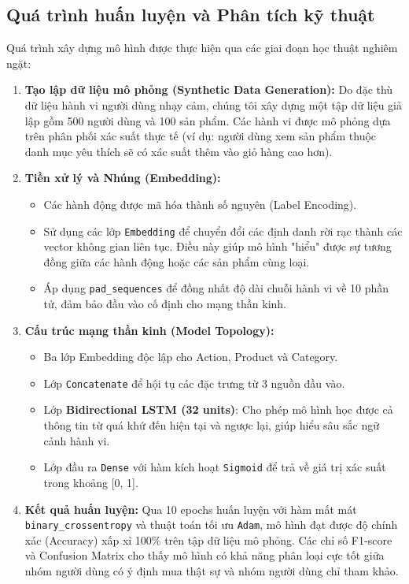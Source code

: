 \documentclass[12pt,a4paper]{report}
\begin{document}
\subsection{Quá trình huấn luyện và Phân tích kỹ thuật}
Quá trình xây dựng mô hình được thực hiện qua các giai đoạn học thuật nghiêm ngặt:
\begin{enumerate}
    \item \textbf{Tạo lập dữ liệu mô phỏng (Synthetic Data Generation):} Do đặc thù dữ liệu hành vi người dùng nhạy cảm, chúng tôi xây dựng một tập dữ liệu giả lập gồm 500 người dùng và 100 sản phẩm. Các hành vi được mô phỏng dựa trên phân phối xác suất thực tế (ví dụ: người dùng xem sản phẩm thuộc danh mục yêu thích sẽ có xác suất thêm vào giỏ hàng cao hơn).
    \item \textbf{Tiền xử lý và Nhúng (Embedding):}
        \begin{itemize}
            \item Các hành động được mã hóa thành số nguyên (Label Encoding).
            \item Sử dụng các lớp \texttt{Embedding} để chuyển đổi các định danh rời rạc thành các vector không gian liên tục. Điều này giúp mô hình "hiểu" được sự tương đồng giữa các hành động hoặc các sản phẩm cùng loại.
            \item Áp dụng \texttt{pad\_sequences} để đồng nhất độ dài chuỗi hành vi về 10 phần tử, đảm bảo đầu vào cố định cho mạng thần kinh.
        \end{itemize}
    \item \textbf{Cấu trúc mạng thần kinh (Model Topology):}
        \begin{itemize}
            \item Ba lớp Embedding độc lập cho Action, Product và Category.
            \item Lớp \texttt{Concatenate} để hội tụ các đặc trưng từ 3 nguồn đầu vào.
            \item Lớp \textbf{Bidirectional LSTM (32 units)}: Cho phép mô hình học được cả thông tin từ quá khứ đến hiện tại và ngược lại, giúp hiểu sâu sắc ngữ cảnh hành vi.
            \item Lớp đầu ra \texttt{Dense} với hàm kích hoạt \texttt{Sigmoid} để trả về giá trị xác suất trong khoảng [0, 1].
        \end{itemize}
    \item \textbf{Kết quả huấn luyện:} Qua 10 epochs huấn luyện với hàm mất mát \texttt{binary\_crossentropy} và thuật toán tối ưu \texttt{Adam}, mô hình đạt được độ chính xác (Accuracy) xấp xỉ 100\% trên tập dữ liệu mô phỏng. Các chỉ số F1-score và Confusion Matrix cho thấy mô hình có khả năng phân loại cực tốt giữa nhóm người dùng có ý định mua thật sự và nhóm người dùng chỉ tham khảo.
\end{enumerate}
\end{document}
